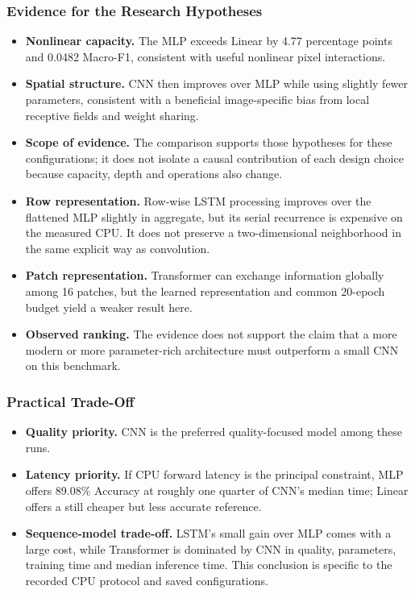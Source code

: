\subsubsection{Evidence for the Research Hypotheses}
\begin{itemize}
\setlength{\itemsep}{3pt}
\setlength{\parskip}{0pt}
\item \textbf{Nonlinear capacity.} The MLP exceeds Linear by 4.77 percentage points and 0.0482 Macro-F1, consistent with useful nonlinear pixel interactions.
\item \textbf{Spatial structure.} CNN then improves over MLP while using slightly fewer parameters, consistent with a beneficial image-specific bias from local receptive fields and weight sharing.
\item \textbf{Scope of evidence.} The comparison supports those hypotheses for these configurations; it does not isolate a causal contribution of each design choice because capacity, depth and operations also change.

\item \textbf{Row representation.} Row-wise LSTM processing improves over the flattened MLP slightly in aggregate, but its serial recurrence is expensive on the measured CPU. It does not preserve a two-dimensional neighborhood in the same explicit way as convolution.
\item \textbf{Patch representation.} Transformer can exchange information globally among 16 patches, but the learned representation and common 20-epoch budget yield a weaker result here.
\item \textbf{Observed ranking.} The evidence does not support the claim that a more modern or more parameter-rich architecture must outperform a small CNN on this benchmark.
\end{itemize}

\subsubsection{Practical Trade-Off}
\begin{itemize}
\setlength{\itemsep}{3pt}
\setlength{\parskip}{0pt}
\item \textbf{Quality priority.} CNN is the preferred quality-focused model among these runs.
\item \textbf{Latency priority.} If CPU forward latency is the principal constraint, MLP offers 89.08\% Accuracy at roughly one quarter of CNN's median time; Linear offers a still cheaper but less accurate reference.
\item \textbf{Sequence-model trade-off.} LSTM's small gain over MLP comes with a large cost, while Transformer is dominated by CNN in quality, parameters, training time and median inference time. This conclusion is specific to the recorded CPU protocol and saved configurations.
\end{itemize}

